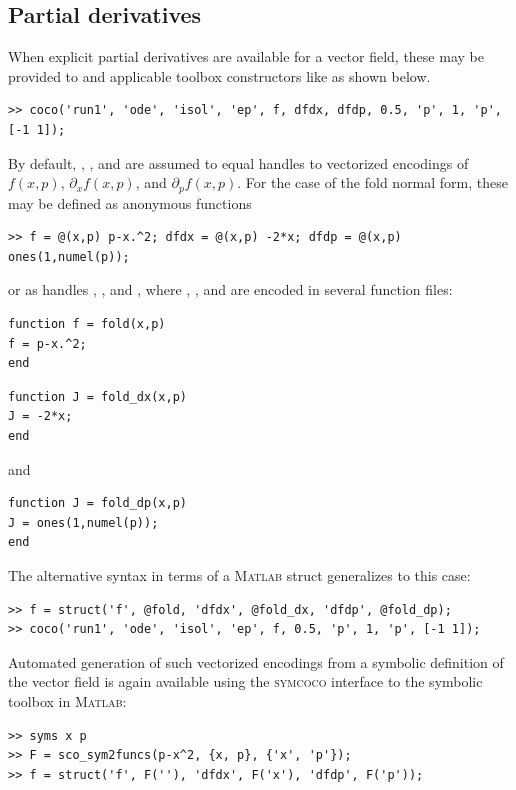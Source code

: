 \subsection{Partial derivatives}
When explicit partial derivatives are available for a vector field, these may be provided to  and applicable toolbox constructors like  as shown below.
\begin{lstlisting}[language=coco-highlight,frame=lines]
>> coco('run1', 'ode', 'isol', 'ep', f, dfdx, dfdp, 0.5, 'p', 1, 'p', [-1 1]);
\end{lstlisting}
By default, , , and  are assumed to equal handles to vectorized encodings of $f(x,p)$, $\partial_xf(x,p)$, and $\partial_pf(x,p)$. For the case of the fold normal form, these may be defined as anonymous functions
\begin{lstlisting}[language=coco-highlight,frame=lines]
>> f = @(x,p) p-x.^2; dfdx = @(x,p) -2*x; dfdp = @(x,p) ones(1,numel(p));
\end{lstlisting}
or as handles , , and , where , , and  are encoded in several function files:
\begin{lstlisting}[language=coco-highlight,frame=shadowbox]
function f = fold(x,p)
f = p-x.^2;
end
\end{lstlisting}
\begin{lstlisting}[language=coco-highlight,frame=shadowbox]
function J = fold_dx(x,p)
J = -2*x;
end
\end{lstlisting}
and
\begin{lstlisting}[language=coco-highlight,frame=shadowbox]
function J = fold_dp(x,p)
J = ones(1,numel(p));
end
\end{lstlisting}
The alternative syntax in terms of a \textsc{Matlab} struct generalizes to this case:
\begin{lstlisting}[language=coco-highlight,frame=lines]
>> f = struct('f', @fold, 'dfdx', @fold_dx, 'dfdp', @fold_dp);
>> coco('run1', 'ode', 'isol', 'ep', f, 0.5, 'p', 1, 'p', [-1 1]);
\end{lstlisting}
Automated generation of such vectorized encodings from a symbolic definition of the vector field is again available using the \textsc{symcoco} interface to the symbolic toolbox in \textsc{Matlab}:
\begin{lstlisting}[language=coco-highlight,frame=lines]
>> syms x p
>> F = sco_sym2funcs(p-x^2, {x, p}, {'x', 'p'});
>> f = struct('f', F(''), 'dfdx', F('x'), 'dfdp', F('p'));
\end{lstlisting}

